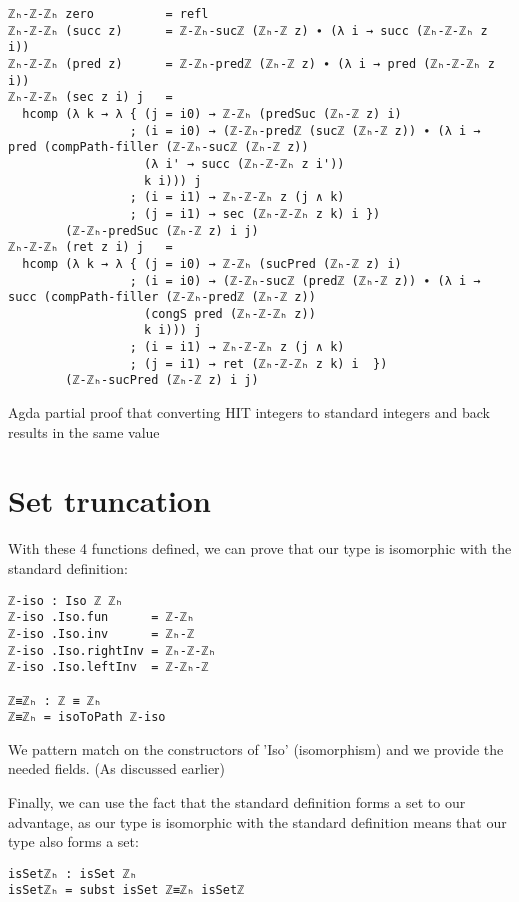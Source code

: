 \begin{listing}[H]
\begin{verbatim}
ℤₕ-ℤ-ℤₕ zero          = refl
ℤₕ-ℤ-ℤₕ (succ z)      = ℤ-ℤₕ-sucℤ (ℤₕ-ℤ z) ∙ (λ i → succ (ℤₕ-ℤ-ℤₕ z i))
ℤₕ-ℤ-ℤₕ (pred z)      = ℤ-ℤₕ-predℤ (ℤₕ-ℤ z) ∙ (λ i → pred (ℤₕ-ℤ-ℤₕ z i))
ℤₕ-ℤ-ℤₕ (sec z i) j   =
  hcomp (λ k → λ { (j = i0) → ℤ-ℤₕ (predSuc (ℤₕ-ℤ z) i)
                 ; (i = i0) → (ℤ-ℤₕ-predℤ (sucℤ (ℤₕ-ℤ z)) ∙ (λ i → pred (compPath-filler (ℤ-ℤₕ-sucℤ (ℤₕ-ℤ z))
                   (λ i' → succ (ℤₕ-ℤ-ℤₕ z i'))
                   k i))) j
                 ; (i = i1) → ℤₕ-ℤ-ℤₕ z (j ∧ k)
                 ; (j = i1) → sec (ℤₕ-ℤ-ℤₕ z k) i })
        (ℤ-ℤₕ-predSuc (ℤₕ-ℤ z) i j)
ℤₕ-ℤ-ℤₕ (ret z i) j   =
  hcomp (λ k → λ { (j = i0) → ℤ-ℤₕ (sucPred (ℤₕ-ℤ z) i)
                 ; (i = i0) → (ℤ-ℤₕ-sucℤ (predℤ (ℤₕ-ℤ z)) ∙ (λ i → succ (compPath-filler (ℤ-ℤₕ-predℤ (ℤₕ-ℤ z))
                   (congS pred (ℤₕ-ℤ-ℤₕ z))
                   k i))) j
                 ; (i = i1) → ℤₕ-ℤ-ℤₕ z (j ∧ k)
                 ; (j = i1) → ret (ℤₕ-ℤ-ℤₕ z k) i  })
        (ℤ-ℤₕ-sucPred (ℤₕ-ℤ z) i j)
\end{verbatim}
\caption{Agda partial proof that converting HIT integers to standard integers and back results in the same value}
\end{listing}

\section{Set truncation}
With these 4 functions defined, we can prove that our type is isomorphic with the standard definition:
\begin{verbatim}
ℤ-iso : Iso ℤ ℤₕ
ℤ-iso .Iso.fun      = ℤ-ℤₕ
ℤ-iso .Iso.inv      = ℤₕ-ℤ
ℤ-iso .Iso.rightInv = ℤₕ-ℤ-ℤₕ
ℤ-iso .Iso.leftInv  = ℤ-ℤₕ-ℤ

ℤ≡ℤₕ : ℤ ≡ ℤₕ
ℤ≡ℤₕ = isoToPath ℤ-iso
\end{verbatim}
We pattern match on the constructors of 'Iso' (isomorphism) and we provide the needed fields. (As discussed earlier)

Finally, we can use the fact that the standard definition forms a set to our advantage, as our type is isomorphic with the standard definition means that our type also forms a set:
\begin{verbatim}
isSetℤₕ : isSet ℤₕ
isSetℤₕ = subst isSet ℤ≡ℤₕ isSetℤ
\end{verbatim}
